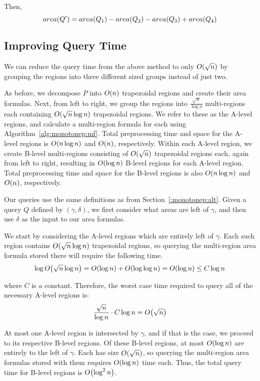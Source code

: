 \noindent Then,
\[
area(Q') = area(Q_1) - area(Q_2) - area(Q_3) + area(Q_4)
\]

\subsection{Improving Query Time}
\label{:mono2:bitfaster}

We can reduce the query time from the above method to only $O\!\left(\sqrt{n}\right)$ by grouping the regions into three different sized groups instead of just two.

As before, we decompose $P$ into $O\!\left(n\right)$ trapezoidal regions and create their area formulas.
Next, from left to right, we group the regions into $\frac{\sqrt{n}}{\log{n}}$ multi-regions each containing $O\!\left(\sqrt{n}\log{n}\right)$ trapezoidal regions.
We refer to these as the A-level regions, and calculate a multi-region formula for each using Algorithm~\ref{alg:monotonep:mf}.
Total preprocessing time and space for the A-level regions is $O\!\left(n\log{n}\right)$ and $O\!\left(n\right)$, respectively.
Within each A-level region, we create B-level multi-regions consisting of $O\!\left(\sqrt{n}\right)$ trapezoidal regions each, again from left to right, resulting in $O\!\left(\log{n}\right)$ B-level regions for each A-level region.
Total preprocessing time and space for the B-level regions is also $O\!\left(n\log{n}\right)$ and $O\!\left(n\right)$, respectively.

Our queries use the same definitions as from Section~\ref{:monotonep:alt}. 
Given a query $Q$ defined by $(\gamma, \delta)$, we first consider what areas are left of $\gamma$, and then use $\delta$ as the input to our area formulas.

We start by considering the A-level regions which are entirely left of $\gamma$. 
Each such region contains $O\!\left(\sqrt{n}\log{n}\right)$ trapezoidal regions, so querying the multi-region area formula stored there will require the following time.
\[
\log{O\!\left(\sqrt{n}\log{n}\right)} = O\!\left(\log{n}\right) + O\!\left(\log{\log{n}}\right) = O\!\left(\log{n}\right) \leq C \log{n}
\]

\noindent where $C$ is a constant.
Therefore, the worst case time required to query all of the necessary A-level regions is:
\[
\frac{\sqrt{n}}{\log{n}} \cdot C \log{n} = O\!\left(\sqrt{n}\right)
\]

At most one A-level region is intersected by $\gamma$, and if that is the case, we proceed to its respective B-level regions.
Of these B-level regions, at most $O\!\left(\log{n}\right)$ are entirely to the left of $\gamma$.
Each has size $O\!\left(\sqrt{n}\right)$, so querying the multi-region area formulas stored with them requires $O\!\left(\log{n}\right)$ time each. Thus, the total query time for B-level regions is $O\!\left(\log^2{n}\right)$.

